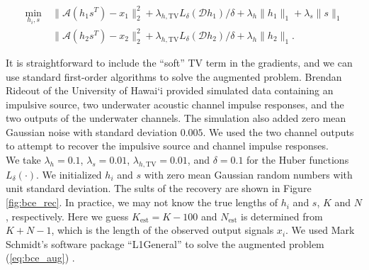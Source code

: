 \documentclass[journal]{IEEEtran}
\begin{document}
\begin{align}
   \label{eq:bce_aug}
   \min_{h_i,s} ~&\|\mathcal{A}(h_1s^T)-x_1\|_2^2 + \lambda_{h,\text{TV}}L_\delta(\mathcal{D}h_1)/\delta + \lambda_{h}\|h_1\|_1+ \lambda_s\|s\|_1\nonumber\\
                 &\|\mathcal{A}(h_2s^T)-x_2\|_2^2 + \lambda_{h,\text{TV}}L_\delta(\mathcal{D}h_2)/\delta + \lambda_{h}\|h_2\|_1.
\end{align}

It is straightforward to include the ``soft'' TV term in the gradients, and we can use standard first-order algorithms to solve the augmented problem.  Brendan Rideout of the University of Hawai`i provided simulated data containing an impulsive source, two underwater acoustic channel impulse responses, and the two outputs of the underwater channels.  The simulation also added zero mean Gaussian noise with standard deviation $0.005$.  We used the two channel outputs to attempt to recover the impulsive source and channel impulse responses.\\

We take $\lambda_h = 0.1$, $\lambda_s=0.01$, $\lambda_{h,\text{TV}}=0.01$, and $\delta=0.1$ for the Huber functions $L_\delta(\cdot)$.  We initialized $h_i$ and $s$ with zero mean Gaussian random numbers with unit standard deviation. The sults of the recovery are shown in Figure \ref{fig:bce_rec}.  In practice, we may not know the true lengths of $h_i$ and $s$, $K$ and $N$, respectively.  Here we guess $K_\text{est} = K-100$ and $N_\text{est}$ is determined from $K+N-1$, which is the length of the observed output signals $x_i$.  We used Mark Schmidt's software package ``L1General'' to solve the augmented problem (\ref{eq:bce_aug}) \cite{schmidt_2010}.
\end{document}
